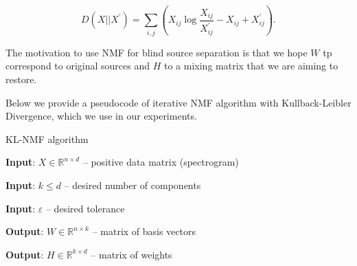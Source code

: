 \documentclass[../main.tex]{subfiles} %
\begin{document}
\[ D \left( X || X^\prime \right) = \sum_{i,j} \left( 
X_{ij} \log{\frac{X_{ij}}{X_{ij}^\prime} - X_{ij} + X_{ij}^\prime}
\right).\]

The motivation to use NMF for blind source separation is that we hope $W$ tp correspond to original sources and $H$ to a mixing matrix that we are aiming to restore.

Below we provide a pseudocode of iterative NMF algorithm with Kullback-Leibler Divergence, which we use in our experiments.

\begin{algorithm} 
	\begin{algorithmic}
		\caption{KL-NMF algorithm}\label{nmf}
		\item \textbf{Input}: $X  \in \mathbb{R}^{n \times d}$ -- positive data matrix (spectrogram)
		\item \textbf{Input}: $k \le d$ -- desired number of components
		\item \textbf{Input}: $\varepsilon$ -- desired tolerance 
		\item \textbf{Output}: $W \in \mathbb{R}^{n \times k}$ -- matrix of basis vectors
		\item \textbf{Output}: $H \in \mathbb{R}^{k \times d}$ -- matrix of weights
		
		 
		\EndFor
		 
		\EndFor
		\EndWhile
		
		\EndFunction
	\end{algorithmic}
\end{algorithm}
\end{document}
